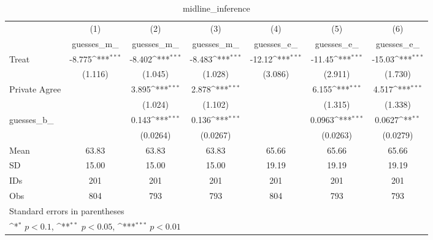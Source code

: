 \begin{table}[htbp]\centering
\def\sym#1{\ifmmode^{#1}\else\(^{#1}\)\fi}
\caption{midline\_inference}
\begin{tabular}{l*{6}{c}}
\hline\hline
                                &\multicolumn{1}{c}{(1)}&\multicolumn{1}{c}{(2)}&\multicolumn{1}{c}{(3)}&\multicolumn{1}{c}{(4)}&\multicolumn{1}{c}{(5)}&\multicolumn{1}{c}{(6)}\\
                                &\multicolumn{1}{c}{guesses\_m\_}&\multicolumn{1}{c}{guesses\_m\_}&\multicolumn{1}{c}{guesses\_m\_}&\multicolumn{1}{c}{guesses\_e\_}&\multicolumn{1}{c}{guesses\_e\_}&\multicolumn{1}{c}{guesses\_e\_}\\
\hline
Treat                           &   -8.775\sym{***}&   -8.402\sym{***}&   -8.483\sym{***}&   -12.12\sym{***}&   -11.45\sym{***}&   -15.03\sym{***}\\
                                &  (1.116)         &  (1.045)         &  (1.028)         &  (3.086)         &  (2.911)         &  (1.730)         \\
Private Agree                   &                  &    3.895\sym{***}&    2.878\sym{***}&                  &    6.155\sym{***}&    4.517\sym{***}\\
                                &                  &  (1.024)         &  (1.102)         &                  &  (1.315)         &  (1.338)         \\
guesses\_b\_                      &                  &    0.143\sym{***}&    0.136\sym{***}&                  &   0.0963\sym{***}&   0.0627\sym{**} \\
                                &                  & (0.0264)         & (0.0267)         &                  & (0.0263)         & (0.0279)         \\
\hline
Mean                            &    63.83         &    63.83         &    63.83         &    65.66         &    65.66         &    65.66         \\
SD                              &    15.00         &    15.00         &    15.00         &    19.19         &    19.19         &    19.19         \\
IDs                             &      201         &      201         &      201         &      201         &      201         &      201         \\
Obs                             &      804         &      793         &      793         &      804         &      793         &      793         \\
\hline\hline
\multicolumn{7}{l}{\footnotesize Standard errors in parentheses}\\
\multicolumn{7}{l}{\footnotesize \sym{*} \(p<0.1\), \sym{**} \(p<0.05\), \sym{***} \(p<0.01\)}\\
\end{tabular}
\end{table}
